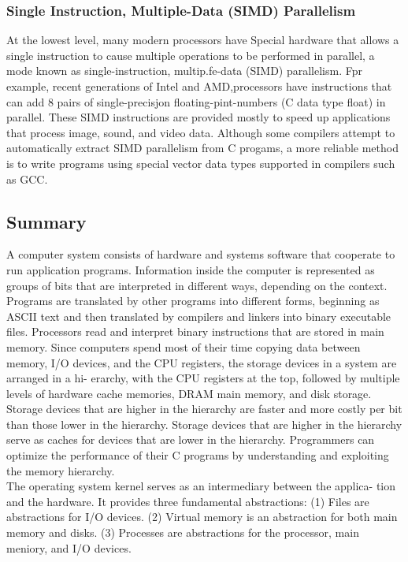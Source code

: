 \documentclass{article}
\begin{document}
\subsubsection{Single Instruction, Multiple-Data (SIMD) Parallelism}
At the lowest level, many modern processors have Special hardware that allows
a single instruction to cause multiple operations to be performed in parallel, a
mode known as single-instruction, multip.fe-data (SIMD) parallelism. Fpr example,
recent generations of Intel and AMD,processors have instructions that can add 8
pairs of single-precisjon floating-pint-numbers (C data type float) in parallel.
These SIMD instructions are provided mostly to speed up applications that
process image, sound, and video data. Although some compilers attempt to automatically
extract SIMD parallelism from C progams, a more reliable method is to
write programs using special vector data types supported in compilers such as GCC.

\subsection{Summary}

A computer system consists of hardware and systems software that cooperate
to run application programs. Information inside the computer is represented as
groups of bits that are interpreted in different ways, depending on the context.
Programs are translated by other programs into different forms, beginning as
ASCII text and then translated by compilers and linkers into binary executable
files.
Processors read and interpret binary instructions that are stored in main memory.
Since computers spend most of their time copying data between memory, I/O
devices, and the CPU registers, the storage devices in a system are arranged in a hi-
erarchy, with the CPU registers at the top, followed by multiple levels of hardware
cache memories, DRAM main memory, and disk storage. Storage devices that are
higher in the hierarchy are faster and more costly per bit than those lower in the 
hierarchy. Storage devices that are higher in the hierarchy serve as caches for
devices that are lower in the hierarchy. Programmers can optimize the performance
of their C programs by understanding and exploiting the memory hierarchy.\\

The operating system kernel serves as an intermediary between the applica-
tion and the hardware. It provides three fundamental abstractions: (1) Files are
abstractions for I/O devices. (2) Virtual memory is an abstraction for both main
memory and disks. (3) Processes are abstractions for the processor, main meniory,
and I/O devices.\\
\end{document}
